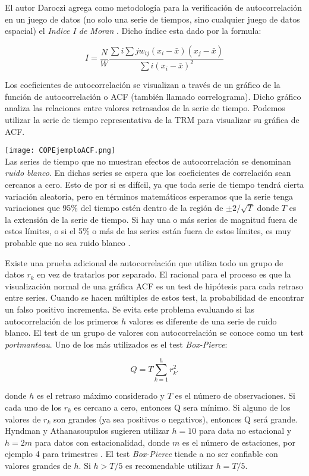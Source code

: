 El autor Daroczi agrega como metodología para la verificación de autocorrelación en un juego de datos (no solo una serie de tiempos, sino cualquier juego de datos espacial) el \emph{Indice I de Moran} \cite{daroczi}. Dicho índice esta dado por la formula:

\[ I = \frac{N}{W}
	\frac{\sum{i}\sum{j}w_{ij}(x_{i} - \bar{x})(x_{j} - \bar{x})}{{\sum{i}(x_{i} - \bar{x})^2}} \]

Los coeficientes de autocorrelación se visualizan a través de un gráfico de la función de autocorrelación o ACF (también llamado correlograma). Dicho gráfico analiza las relaciones entre valores retrasados de la serie de tiempo. Podemos utilizar la serie de tiempo representativa de la TRM para visualizar su gráfica de ACF.

\texttt{[image: COPEjemploACF.png]}\\

Las series de tiempo que no muestran efectos de autocorrelación se denominan \emph{ruido blanco}. En dichas series se espera que los coeficientes de correlación sean cercanos a cero. Esto de por si es difícil, ya que toda serie de tiempo tendrá cierta variación aleatoria, pero en términos matemáticos esperamos que la serie tenga variaciones que 95\% del tiempo estén dentro de la región de $\pm2/\sqrt{T}$ donde $T$ es la extensión de la serie de tiempo. Si hay una o más series de magnitud fuera de estos límites, o si el 5\% o más de las series están fuera de estos límites, es muy probable que no sea ruido blanco \cite{hyndman}.

Existe una prueba adicional de autocorrelación que utiliza todo un grupo de datos $r_k$ en vez de tratarlos por separado. El racional para el proceso es que la visualización normal de una gráfica ACF es un test de hipótesis para cada retraso entre series. Cuando se hacen múltiples de estos test, la probabilidad de encontrar un falso positivo incrementa. Se evita este problema evaluando si las autocorrelación de los primeros $h$ valores es diferente de una serie de ruido blanco. El test de un grupo de valores con autocorrelación se conoce como un test \emph{portmanteau}. Uno de los más utilizados es el test \emph{Box-Pierce}:

\[ Q = T \sum_{k=1}^{h}r_{k\prime}^2 \]

donde $h$ es el retraso máximo considerado y $T$ es el número de observaciones. Si cada uno de los $r_k$ es cercano a cero, entonces Q sera mínimo. Si alguno de los valores de $r_k$ son grandes (ya sea positivos o negativos), entonces Q será grande. Hyndman y Athanasoupulos sugieren utilizar $h = 10$ para data no estacional y $h = 2m$ para datos con estacionalidad, donde $m$ es el número de estaciones, por ejemplo 4 para trimestres \cite{hyndman}.  El test \emph{Box-Pierce} tiende a no ser confiable con valores grandes de $h$. Si $h > T/5$ es recomendable utilizar $h=T/5$.

